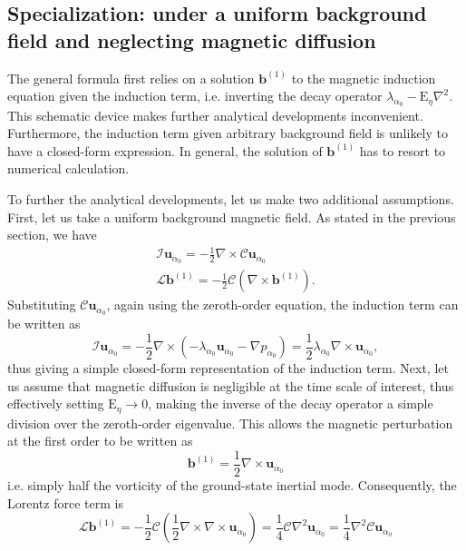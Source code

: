 \subsection{Specialization: under a uniform background field and neglecting magnetic diffusion}

The general formula first relies on a solution $\mathbf{b}^{(1)}$ to the magnetic induction equation given the induction term, i.e. inverting the decay operator $\lambda_{\alpha_0} - \mathrm{E}_\eta \nabla^2$. This schematic device makes further analytical developments inconvenient. Furthermore, the induction term given arbitrary background field is unlikely to have a closed-form expression. In general, the solution of $\mathbf{b}^{(1)}$ has to resort to numerical calculation.

To further the analytical developments, let us make two additional assumptions. First, let us take a uniform background magnetic field. As stated in the previous section, we have
%
\begin{gather}
    \mathcal{I} \mathbf{u}_{\alpha_0} = - \frac{1}{2} \nabla\times \mathcal{C} \mathbf{u}_{\alpha_0} \\
    \mathcal{L} \mathbf{b}^{(1)} = - \frac{1}{2} \mathcal{C} (\nabla\times \mathbf{b}^{(1)}).
\end{gather}
%
Substituting $\mathcal{C} \mathbf{u}_{\alpha_0}$, again using the zeroth-order equation, the induction term can be written as 
%
\begin{equation}
    \mathcal{I} \mathbf{u}_{\alpha_0} = - \frac{1}{2} \nabla\times \left(-\lambda_{\alpha_0} \mathbf{u}_{\alpha_0} - \nabla p_{\alpha_0}\right) = \frac{1}{2} \lambda_{\alpha_0} \nabla\times \mathbf{u}_{\alpha_0},
\end{equation}
%
thus giving a simple closed-form representation of the induction term. Next, let us assume that magnetic diffusion is negligible at the time scale of interest, thus effectively setting $\mathrm{E}_\eta \rightarrow 0$, making the inverse of the decay operator a simple division over the zeroth-order eigenvalue. This allows the magnetic perturbation at the first order to be written as 
%
\begin{equation}
    \mathbf{b}^{(1)} = \frac{1}{2} \nabla\times \mathbf{u}_{\alpha_0}
\end{equation}
%
i.e. simply half the vorticity of the ground-state inertial mode. Consequently, the Lorentz force term is
%
\begin{equation}
    \mathcal{L} \mathbf{b}^{(1)} = - \frac{1}{2} \mathcal{C} \left(\frac{1}{2} \nabla \times \nabla\times \mathbf{u}_{\alpha_0} \right) = \frac{1}{4} \mathcal{C} \nabla^2 \mathbf{u}_{\alpha_0} = \frac{1}{4} \nabla^2 \mathcal{C} \mathbf{u}_{\alpha_0}
\end{equation}
